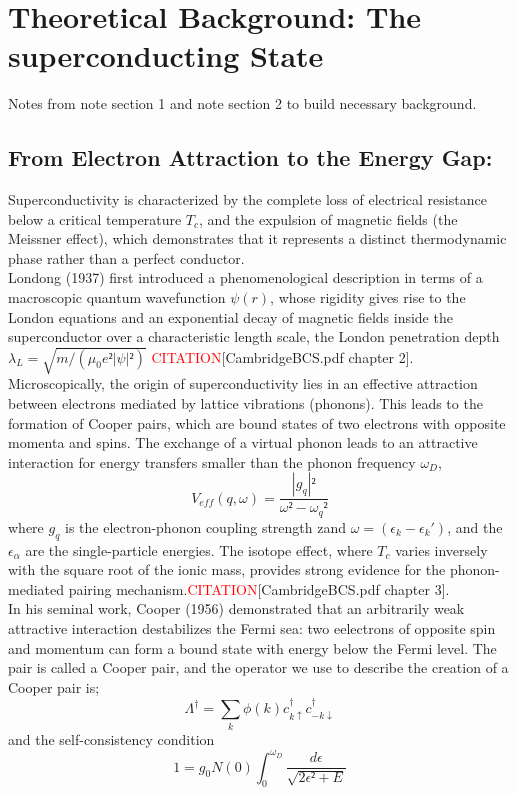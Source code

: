 \documentclass[11pt, letterpaper, titlepage]{article}
\begin{document}
\section{Theoretical Background: The superconducting State}
Notes from note section 1 and note section 2 to build necessary background.\par
\subsection{From Electron Attraction to the Energy Gap:} 
Superconductivity is characterized by the complete loss of electrical resistance below a critical temperature $T_c$, and the expulsion of magnetic fields (the Meissner effect), which demonstrates that it represents a distinct thermodynamic phase rather than a perfect conductor.\\
Londong (1937) first introduced a phenomenological description in terms of a macroscopic quantum wavefunction $ψ(r)$, whose rigidity gives rise to the London equations and an exponential decay of magnetic fields inside the superconductor over a characteristic length scale, the London penetration depth $λ_L = \sqrt{m / (μ_{0}e² |ψ|²)}$ \textcolor{red}{CITATION}[CambridgeBCS.pdf chapter 2].\\
Microscopically, the origin of superconductivity lies in an effective attraction between electrons mediated by lattice vibrations (phonons). This leads to the formation of Cooper pairs, which are bound states of two electrons with opposite momenta and spins. The exchange of a virtual phonon leads to an attractive interaction for energy transfers smaller than the phonon frequency $ω_D$,
$$
V_{eff}(q,ω) = \frac{|g_q|²}{ω² - ω_q²} 
$$
where $g_q$ is the electron-phonon coupling strength zand $ω = (ϵ_k - ϵ_k')$, and the $ϵ_α$ are the single-particle energies. The isotope effect, where $T_c$ varies inversely with the square root of the ionic mass, provides strong evidence for the phonon-mediated pairing mechanism.\textcolor{red}{CITATION}[CambridgeBCS.pdf chapter 3].\\
In his seminal work, Cooper (1956) demonstrated that an arbitrarily weak attractive interaction destabilizes the Fermi sea: two eelectrons of opposite spin and momentum can form a bound state with energy below the Fermi level. The pair is called a Cooper pair, and the operator we use to describe the creation of a Cooper pair is;
$$
Λ^{†} = ∑_{k}^{}ϕ(k) c_{k↑}^{†} c_{-k↓}^{†} 
$$
and the self-consistency condition 
$$
1 = g_{0} N(0) ∫_{0}^{ω_D} \frac{dϵ}{\sqrt{2ϵ² + E}}
$$
\end{document}
